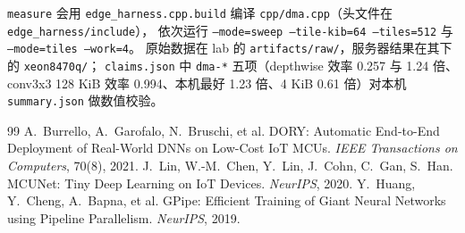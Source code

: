 \documentclass[11pt,a4paper]{ctexart}
\begin{document}
\texttt{measure} 会用 \texttt{edge\_harness.cpp.build} 编译 \texttt{cpp/dma.cpp}（头文件在 \nolinkurl{edge_harness/include}），
依次运行 \texttt{--mode=sweep --tile-kib=64 --tiles=512} 与 \texttt{--mode=tiles --work=4}。
原始数据在 lab 的 \nolinkurl{artifacts/raw/}，服务器结果在其下的 \nolinkurl{xeon8470q/}；
\texttt{claims.json} 中 \texttt{dma-*} 五项（depthwise 效率 0.257 与 1.24 倍、conv3x3 128 KiB 效率 0.994、本机最好 1.23 倍、4 KiB 0.61 倍）对本机 \texttt{summary.json} 做数值校验。


\begin{thebibliography}{99}
 A.~Burrello, A.~Garofalo, N.~Bruschi, et al. DORY: Automatic End-to-End Deployment of Real-World DNNs on Low-Cost IoT MCUs. \emph{IEEE Transactions on Computers}, 70(8), 2021.
 J.~Lin, W.-M.~Chen, Y.~Lin, J.~Cohn, C.~Gan, S.~Han. MCUNet: Tiny Deep Learning on IoT Devices. \emph{NeurIPS}, 2020.
 Y.~Huang, Y.~Cheng, A.~Bapna, et al. GPipe: Efficient Training of Giant Neural Networks using Pipeline Parallelism. \emph{NeurIPS}, 2019.
\end{thebibliography}
\end{document}
